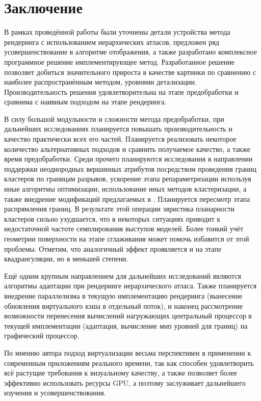 
\section{Заключение}
В рамках проведённой работы были уточнены детали устройства метода рендеринга с использованием иерархических атласов, предложен ряд усовершенствование в алгоритме отображения, а также разработано комплексное программное решение имплементирующее метод. Разработанное решение позволяет добиться значительного прироста в качестве картинки по сравнению с наиболее распространённым методом, уровнями детализации. Производительность решения удовлетворительна на этапе предобработки и сравнима с наивным подходом на этапе рендеринга.

В силу большой модульности и сложности метода предобработки, при дальнейших исследованиях планируется повышать производительность и качество практически всех его частей. Планируется реализовать некоторое количество альтернативных подходов и сравнить получаемое качество, а также время предобработки. Среди прочего планируются исследования в направлении поддержки неоднородных вершинных атрибутов посредством проведения границ кластеров по границам разрывов, ускорение этапа репараметризации используя иные алгоритмы оптимизации, использование иных методов кластеризации, а также внедрение модификаций предлагаемых в \cite{feng2010feature}. Планируется пересмотр этапа распрямления границ. В результате этой операции эвристика планарности кластеров сильно ухудшается, что в некоторых ситуациях приводит к недостаточной частоте семплирования выступов моделей. Более тонкий учёт геометрии поверхности на этапе сглаживания может помочь избавится от этой проблемы. Отметим, что аналогичный эффект проявляется и на этапе квадрангуляции, но в меньшей степени.

Ещё одним крупным направлением для дальнейших исследований являются алгоритмы адаптации при рендеринге иерархического атласа. Также планируется внедрение параллелизма в текущую имплементацию рендеринга (вынесение обновления виртуального кэша в отдельный поток), и наконец рассмотрение возможности перенесения вычислений нагружающих центральный процессор в текущей имплементации (адаптация, вычисление мип уровней для границ) на графический процессор.

По мнению автора подход виртуализации весьма перспективен в применении к современным приложениям реального времени, так как способен удовлетворить всё растущие требования к визуальному качеству, а также позволяет более эффективно использовать ресурсы GPU, а поэтому заслуживает дальнейшего изучения и усовершенствования.
